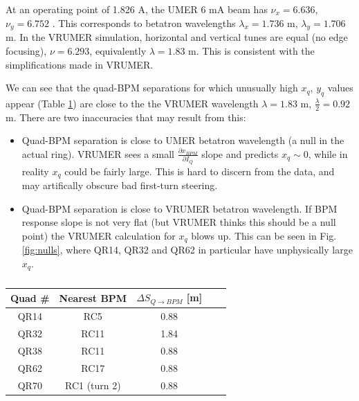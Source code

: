 At an operating point of 1.826 A, the UMER 6 mA beam has $\nu_x = 6.636$, $\nu_y=6.752$ \cite{Rami_note}. This corresponds to betatron wavelengths $\lambda_x = 1.736$ m, $\lambda_y=1.706$ m.
In the VRUMER simulation, horizontal and vertical tunes are equal (no edge focusing), $\nu=6.293$, equivalently $\lambda = 1.83$ m. This is consistent with the simplifications made in VRUMER. 

We can see that the quad-BPM separations for which unusually high $x_q$, $y_q$ values appear (Table \ref{tab:nulls}) are close to the the VRUMER wavelength $\lambda = 1.83$ m, $\frac{\lambda}{2} = 0.92$ m. There are two inaccuracies that may result from this:

\begin{itemize}
\item Quad-BPM separation is close to UMER betatron wavelength (a null in the actual ring). VRUMER sees a small $\frac{\partial x_{BPM}}{\partial I_Q}$ slope and predicts $x_q \sim 0$, while in reality $x_q$ could be fairly large. This is hard to discern from the data, and may artifically obscure bad first-turn steering.
\item Quad-BPM separation is close to VRUMER betatron wavelength. If BPM response slope is not very flat (but VRUMER thinks this should be a null point) the VRUMER calculation for $x_q$ blows up. This can be seen in Fig. \ref{fig:nulls}, where QR14, QR32 and QR62 in particular have unphysically large $x_q$.  
\end{itemize}



\begin{table}
\centering
\caption{}
\label{tab:nulls}
\begin{tabular}{|c|c|c|c|c|}
Quad \# & Nearest BPM & $\Delta S_{Q \rightarrow BPM}$ [m] \\
\hline
QR14 & RC5 & 0.88   \\
QR32 & RC11 & 1.84 \\
QR38 & RC11 & 0.88 \\
QR62 & RC17 & 0.88  \\
QR70 & RC1 (turn 2) & 0.88  \\
\end{tabular}
\end{table}



